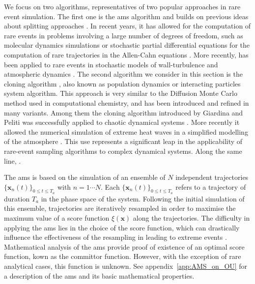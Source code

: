 \documentclass{jfm}
\newcommand{\EL}[1]{{\color{myred}{#1}}}
\begin{document}
We focus on two algorithms, representatives of two popular approaches in rare event simulation.
The first one is the \acl{ams} algorithm \citep{cerou_adaptive_2007} and builds on previous ideas about splitting approaches \citep{KahnHarris1951,glasserman_multilevel_1999}.
In recent years, it has allowed for the computation of rare events in problems involving a large number of degrees of freedom, such as molecular dynamics simulations \citep{aristoff_adaptive_2015,teo_adaptive_2016} or stochastic partial differential equations for the computation of rare trajectories in the Allen-Cahn equations \citep{rolland_computing_2016}. More recently, \EL{it} has been applied to rare events in stochastic models of wall-turbulence \citep{rolland_extremely_2018} and atmospheric dynamics \citep{bouchet2019rare}.
The second algorithm we consider in this section is the cloning algorithm \citep{giardina_direct_2006}, also known as population dynamics or interacting particles system algorithm.
This approach is very similar to the Diffusion Monte Carlo method used in computational chemistry, and has been introduced and refined in many variants.
Among them the cloning algorithm introduced by Giardina and Peliti \citep{giardina_direct_2006} was successfully applied to chaotic dynamical systems \citep{giardina_simulating_2011,Laffargue_2013}.
More recently it allowed the numerical simulation of extreme heat waves in a simplified modelling of the atmosphere \citep{ragone_computation_2018}.
This use represents a significant leap in the applicability of rare-event sampling algorithms to complex dynamical systems.
Along the same line, \EL{rare-event sampling algorithms are here applied outside of traditional applications by considering fluid-structure interaction in a turbulent flow}.

The \ac{ams} is based on the simulation of an ensemble of $N$ independent trajectories $\{\mathbf{x}_n(t)\}_{0\leq t \leq T_a}$ with $n=1 \cdots N$.
Each $\{\mathbf{x}_n(t)\}_{0\leq t \leq T_a}$ refers to a trajectory of duration $T_a$ in the phase space of the
system.
Following the initial simulation of this ensemble, trajectories are iteratively resampled in order to maximise the maximum value of a score function $\xi(\mathbf{x})$ along the trajectories.
The difficulty in applying the \ac{ams} lies in the choice of the score function, which can drastically
influence the effectiveness of the resampling in leading to extreme events \citep{rolland_statistical_2015}.
Mathematical analysis of the \ac{ams} provide proof of existence of an optimal score function, kown as the
committor function. However, with the exception of rare analytical cases, this function is unknown.
See appendix~\ref{app:AMS_on_OU} for a description of the \ac{ams} and its basic mathematical properties.
\end{document}

